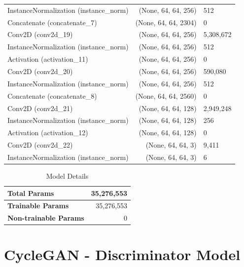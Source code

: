 \documentclass[12pt,DIV14,BCOR12mm,a4paper,footinclude=false,headinclude,parskip=half-,twoside,openright,cleardoublepage=empty,toc=index,bibliography=totoc,listof=totoc]{scrreprt}
\numberwithin{equation}{chapter}
\begin{document}
\begin{longtable}{lrl}
		InstanceNormalization (instance\_norm) & (None, 64, 64, 256)         & 512              \\
		Concatenate (concatenate\_7)          & (None, 64, 64, 2304)        & 0                \\
		Conv2D (conv2d\_19)                  & (None, 64, 64, 256)         & 5,308,672        \\
		InstanceNormalization (instance\_norm) & (None, 64, 64, 256)         & 512              \\
		Activation (activation\_11)           & (None, 64, 64, 256)         & 0                \\
		Conv2D (conv2d\_20)                  & (None, 64, 64, 256)         & 590,080          \\
		InstanceNormalization (instance\_norm) & (None, 64, 64, 256)         & 512              \\ 
		Concatenate (concatenate\_8)          & (None, 64, 64, 2560)        & 0                \\
		Conv2D (conv2d\_21)                  & (None, 64, 64, 128)         & 2,949,248         \\ 
		InstanceNormalization (instance\_norm) & (None, 64, 64, 128)         & 256              \\ 
		Activation (activation\_12)           & (None, 64, 64, 128)         & 0                \\
		Conv2D (conv2d\_22)                  & (None, 64, 64, 3)           & 9,411            \\
		InstanceNormalization (instance\_norm) & (None, 64, 64, 3)           & 6                \\ 
\end{longtable}

\begin{table}
    \centering
    \caption{Model Details}
    \label{tab:model_details_gen}
    \begin{tabular}{lr}
        \toprule
        \textbf{Total Params}          & 35,276,553 \\ 
        \midrule
        \textbf{Trainable Params}      & 35,276,553 \\ 
        \midrule
        \textbf{Non-trainable Params}  & 0          \\ 
        \bottomrule
    \end{tabular}
\end{table}


\section{CycleGAN - Discriminator Model}
\label{appendix:discriminator_model}
\end{document}
